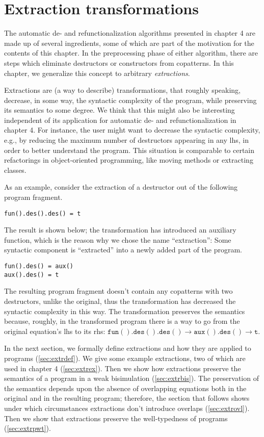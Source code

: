 \chapter{Extraction transformations}

The automatic de- and refunctionalization algorithms presented in chapter 4 are made up of several ingredients, some of which are part of the motivation for the contents of this chapter. In the preprocessing phase of either algorithm, there are steps which eliminate destructors or constructors from copatterns. In this chapter, we generalize this concept to arbitrary \textit{extractions}.

Extractions are (a way to describe) transformations, that roughly speaking, decrease, in some way, the syntactic complexity of the program, while preserving its semantics to some degree. We think that this might also be interesting independent of its application for automatic de- and refunctionalization in chapter 4. For instance, the user might want to decrease the syntactic complexity, e.g., by reducing the maximum number of destructors appearing in any lhs, in order to better understand the program. This situation is comparable to certain refactorings in object-oriented programming, like moving methods or extracting classes.

As an example, consider the extraction of a destructor out of the following program fragment.
\begin{lstlisting}
fun().des().des() = t
\end{lstlisting}
The result is shown below; the transformation has introduced an auxiliary function, which is the reason why we chose the name ``extraction'': Some syntactic component is ``extracted'' into a newly added part of the program.
\begin{lstlisting}
fun().des() = aux()
aux().des() = t
\end{lstlisting}
The resulting program fragment doesn't contain any copatterns with two destructors, unlike the original, thus the transformation has decreased the syntactic complexity in this way. The transformation preserves the semantics because, roughly, in the transformed program there is a way to go from the original equation's lhs to its rhs: $\mathtt{fun().des().des()} \longrightarrow \mathtt{aux().des()} \longrightarrow \mathtt{t}$.

In the next section, we formally define extractions and how they are applied to programs (\autoref{sec:extrdef}). We give some example extractions, two of which are used in chapter 4 (\autoref{sec:extrex}). Then we show how extractions preserve the semantics of a program in a weak bisimulation (\autoref{sec:extrbis}). The preservation of the semantics depends upon the absence of overlapping equations both in the original and in the resulting program; therefore, the section that follows shows under which circumstances extractions don't introduce overlaps (\autoref{sec:extrovl}). Then we show that extractions preserve the well-typedness of programs (\autoref{sec:extrpwt}).

